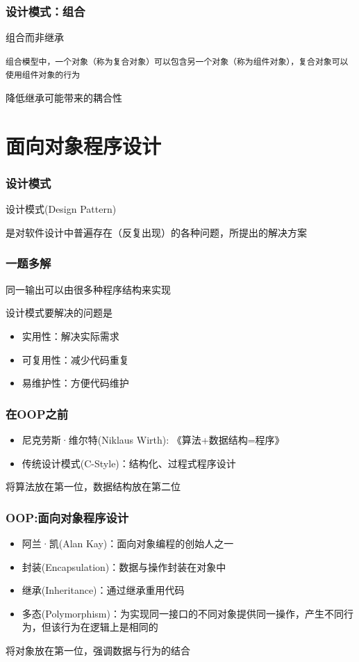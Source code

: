 \documentclass[UTF8, 16pt]{beamer}
\begin{document}
\begin{frame}
    \frametitle{设计模式：组合}
    \textcolor{sufered}{组合而非继承}

    \texttt{组合模型中，一个对象（称为复合对象）可以包含另一个对象（称为组件对象），复合对象可以使用组件对象的行为}

    \textcolor{sufered}{降低继承可能带来的耦合性}
\end{frame}

\section{面向对象程序设计}
\begin{frame}
    \frametitle{设计模式}
    \textcolor{sufered}{设计模式(Design Pattern)}

    是对软件设计中普遍存在（反复出现）的各种问题，所提出的解决方案
\end{frame}

\begin{frame}
    \frametitle{一题多解}
    同一输出可以由很多种程序结构来实现

    \textcolor{sufered}{设计模式要解决的问题是}
    \begin{itemize}
        \item 实用性：解决实际需求
        \item 可复用性：减少代码重复
        \item 易维护性：方便代码维护
    \end{itemize}
\end{frame}

\begin{frame}
    \frametitle{在OOP之前}
    \begin{itemize}
        \item 尼克劳斯·维尔特(Niklaus Wirth): 《算法+数据结构=程序》
        \item 传统设计模式(C-Style)：结构化、过程式程序设计
    \end{itemize}

    \textcolor{sufered}{将算法放在第一位，数据结构放在第二位}
\end{frame}

\begin{frame}
    \frametitle{OOP:面向对象程序设计}
    \begin{itemize}
        \item 阿兰·凯(Alan Kay)：面向对象编程的创始人之一
        \item 封装(Encapsulation)：数据与操作封装在对象中
        \item 继承(Inheritance)：通过继承重用代码
        \item 多态(Polymorphism)：为实现同一接口的不同对象提供同一操作，产生不同行为，但该行为在逻辑上是相同的
    \end{itemize}

    \textcolor{sufered}{将对象放在第一位，强调数据与行为的结合}
\end{frame}
\end{document}
